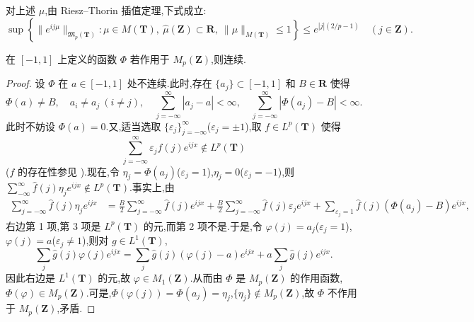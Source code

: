 \begin{note}\label{note:3.5.22}
对上述 $\mu$,由 Riesz--Thorin 插值定理,下式成立:
\begin{equation*}
\sup\left\{\|e^{ij\mu}\|_{\mathfrak{M}_{p}(\mathbf{T})}: \mu \in M(\mathbf{T}),\ \hat{\mu}(\mathbf{Z}) \subset \mathbf{R},\ \|\mu\|_{M(\mathbf{T})} \leq 1\right\} \leq e^{|j|(2/p - 1)} \quad (j \in \mathbf{Z}).
\end{equation*}
\end{note}

\begin{lemma}\label{lem:3.5.23}
在 $[-1, 1]$ 上定义的函数 $\Phi$ 若作用于 $M_{p}(\mathbf{Z})$,则连续.
\end{lemma}

\begin{proof}
设 $\Phi$ 在 $a \in [-1, 1]$ 处不连续.此时,存在 $\{a_j\} \subset [-1, 1]$ 和 $B \in \mathbf{R}$ 使得
\begin{equation*}
\Phi(a) \neq B, \quad a_i \neq a_j \ (i \neq j), \quad \sum_{j=-\infty}^{\infty}|a_j - a| < \infty, \quad \sum_{j=-\infty}^{\infty}|\Phi(a_j) - B| < \infty.
\end{equation*}
此时不妨设 $\Phi(a)=0$.又,适当选取 $\{\varepsilon_{j}\}_{j=-\infty}^{\infty}$($\varepsilon_{j}=\pm1$),取 $f \in L^{p}(\mathbf{T})$ 使得
\begin{equation*}
\sum_{j=-\infty}^{\infty}\varepsilon_{j}\widehat{f}(j)e^{ijx} \notin L^{p}(\mathbf{T})
\end{equation*}
($f$ 的存在性参见 \cite{ch3:24}).现在,令 $\eta_{j} = \Phi(a_{j})$($\varepsilon_{j} = 1$),$\eta_{j} = 0$($\varepsilon_{j} = -1$),则 $\sum_{-\infty}^{\infty}\widehat{f}(j)\eta_{j}e^{ijx} \notin L^{p}(\mathbf{T})$.事实上,由
\begin{align*}
\sum_{j=-\infty}^{\infty}\widehat{f}(j)\eta_{j}e^{ijx}&= \frac{B}{2}\sum_{j=-\infty}^{\infty}\widehat{f}(j)e^{ijx} + \frac{B}{2}\sum_{j=-\infty}^{\infty}\widehat{f}(j)\varepsilon_{j}e^{ijx} + \sum_{\varepsilon_{j}=1}\widehat{f}(j)(\Phi(a_{j}) - B)e^{ijx},
\end{align*}
右边第 1 项,第 3 项是 $L^{p}(\mathbf{T})$ 的元,而第 2 项不是.于是,令 $\varphi(j)=a_{j}$($\varepsilon_{j}=1$),$\varphi(j)=a$($\varepsilon_{j}\neq1$),则对 $g\in L^{1}(\mathbf{T})$,
\begin{equation*}
\sum_{j}\widehat{g}(j)\varphi(j)e^{ijx} = \sum_{j}\widehat{g}(j)(\varphi(j) - a)e^{ijx} + a\sum_{j}\widehat{g}(j)e^{ijx}.
\end{equation*}
因此右边是 $L^{1}(\mathbf{T})$ 的元,故 $\varphi \in M_{1}(\mathbf{Z})$.从而由 $\Phi$ 是 $M_{p}(\mathbf{Z})$ 的作用函数,$\Phi(\varphi) \in M_{p}(\mathbf{Z})$.可是,$\Phi(\varphi(j)) = \Phi(a_j) = \eta_j$,$\{\eta_j\} \notin M_p(\mathbf{Z})$,故 $\Phi$ 不作用于 $M_p(\mathbf{Z})$,矛盾.
\end{proof}

